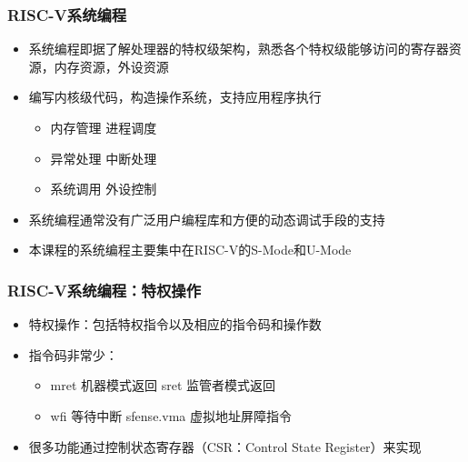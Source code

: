 
\begin{frame}
    \frametitle{RISC-V系统编程}
    \begin{itemize}
        \item 系统编程即据了解处理器的特权级架构，熟悉各个特权级能够访问的寄存器资源，内存资源，外设资源        
        \item 编写内核级代码，构造操作系统，支持应用程序执行
        \begin{itemize}
            \item 内存管理 \quad 进程调度
            \item 异常处理 \quad 中断处理
            \item 系统调用 \quad 外设控制
        \end{itemize}				
        \item 系统编程通常没有广泛用户编程库和方便的动态调试手段的支持
        \item 本课程的系统编程主要集中在RISC-V的S-Mode和U-Mode
    \end{itemize}
    
\end{frame}


\begin{frame}
    \frametitle{RISC-V系统编程：特权操作}
    \begin{itemize}
        \item 特权操作：包括特权指令以及相应的指令码和操作数       
        \item 指令码非常少：
        \begin{itemize}
            \item mret 机器模式返回 \quad sret 监管者模式返回
            \item wfi 等待中断 \quad \quad \quad \quad sfense.vma 虚拟地址屏障指令
        \end{itemize}				
        \item 很多功能通过控制状态寄存器（CSR：Control State Register）来实现
    \end{itemize}
    
\end{frame}


